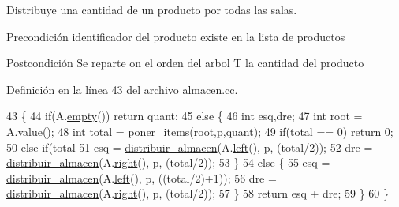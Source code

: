 Distribuye una cantidad de un producto por todas las salas. 

\begin{DoxyPrecond}{Precondición}
identificador del producto existe en la lista de productos 
\end{DoxyPrecond}
\begin{DoxyPostcond}{Postcondición}
Se reparte on el orden del arbol T la cantidad del producto 
\end{DoxyPostcond}


Definición en la línea 43 del archivo almacen.\+cc.


\begin{DoxyCode}
43                                                                      \{
44   \textcolor{keywordflow}{if}(A.\mbox{\hyperlink{class_bin_tree_a74cda259ba5c25b8ee38ed4dc33e4fad}{empty}}()) \textcolor{keywordflow}{return} quant;
45   \textcolor{keywordflow}{else} \{
46     \textcolor{keywordtype}{int} esq,dre;
47     \textcolor{keywordtype}{int} root = A.\mbox{\hyperlink{class_bin_tree_a734e785b089c87b49187ee7c58edf5f3}{value}}(); 
48     \textcolor{keywordtype}{int} total = \mbox{\hyperlink{class_almacen_ad2829b7fb8be4ced00511472636982bf}{poner\_items}}(root,p,quant);
49     \textcolor{keywordflow}{if}(total == 0) \textcolor{keywordflow}{return} 0;
50     \textcolor{keywordflow}{else} \textcolor{keywordflow}{if}(total%
51       esq = \mbox{\hyperlink{class_almacen_a2535172748b53c612e9347da5fd3bec6}{distribuir\_almacen}}(A.\mbox{\hyperlink{class_bin_tree_a82108db4c1b08d1f111027788c196d4e}{left}}(), p, (total/2));
52       dre = \mbox{\hyperlink{class_almacen_a2535172748b53c612e9347da5fd3bec6}{distribuir\_almacen}}(A.\mbox{\hyperlink{class_bin_tree_aff8e96651b27284c329667b5ad3e4d0b}{right}}(), p, (total/2));
53     \}
54     \textcolor{keywordflow}{else} \{
55       esq = \mbox{\hyperlink{class_almacen_a2535172748b53c612e9347da5fd3bec6}{distribuir\_almacen}}(A.\mbox{\hyperlink{class_bin_tree_a82108db4c1b08d1f111027788c196d4e}{left}}(), p, ((total/2)+1));
56       dre = \mbox{\hyperlink{class_almacen_a2535172748b53c612e9347da5fd3bec6}{distribuir\_almacen}}(A.\mbox{\hyperlink{class_bin_tree_aff8e96651b27284c329667b5ad3e4d0b}{right}}(), p, (total/2));
57     \}
58     \textcolor{keywordflow}{return} esq + dre;
59   \}
60 \}
\end{DoxyCode}
\mbox{\label{class_almacen_af43c26eb16a3438cae08a14a86bc53cd}} 
